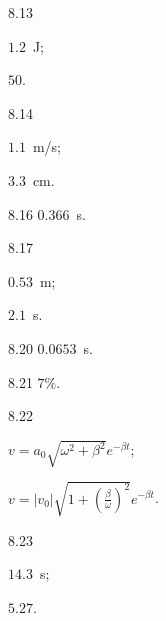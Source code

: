 \begin{Solution}{8.{13}}
		\begin{enumerate*}[label=(\alph*)]
			\item $1.2$~J;
			\item $50$.
		\end{enumerate*}
	
\end{Solution}
\begin{Solution}{8.{14}}
		\begin{enumerate*}[label=(\alph*)]
			\item $1.1$~m/s;
			\item $3.3$~cm.
		\end{enumerate*}
	
\end{Solution}
\begin{Solution}{8.{16}}
		$0.366$~\si{\second}.
	
\end{Solution}
\begin{Solution}{8.{17}}
		\begin{enumerate*}[label=(\alph*)]
			\item $0.53$~m;
			\item $2.1$~s.
		\end{enumerate*}
	
\end{Solution}
\begin{Solution}{8.{20}}
		$0.0653$~\si{\second}.
	
\end{Solution}
\begin{Solution}{8.{21}}
		$7\%$.
	
\end{Solution}
\begin{Solution}{8.{22}}
		\begin{enumerate*}[label=(\alph*)]
			\item $v = a_0\sqrt{\omega^2 + \beta^2}e^{-\beta t}$;
			\item $v = |v_0|  \sqrt{1 +  \left( \frac{\beta}{\omega}\right)^2}e^{-\beta t}$.
		\end{enumerate*}	
	
\end{Solution}
\begin{Solution}{8.{23}}
		\begin{enumerate*}[label=(\alph*)]
			\item $14.3$~s;
			\item $5.27$.
		\end{enumerate*}
	
\end{Solution}
